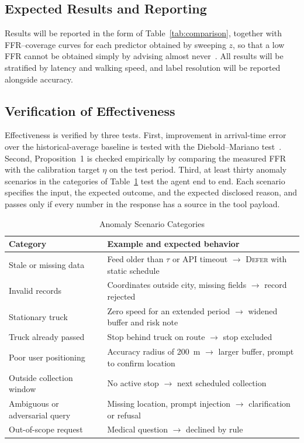 \subsection{Expected Results and Reporting}
Results will be reported in the form of Table~\ref{tab:comparison}, together with FFR--coverage curves for each predictor obtained by sweeping $z$, so that a low FFR cannot be obtained simply by advising almost never~\cite{geifman2017}. All results will be stratified by latency and walking speed, and label resolution will be reported alongside accuracy.



\subsection{Verification of Effectiveness}
Effectiveness is verified by three tests. First, improvement in arrival-time error over the historical-average baseline is tested with the Diebold--Mariano test~\cite{diebold1995}. Second, Proposition~1 is checked empirically by comparing the measured FFR with the calibration target $\eta$ on the test period. Third, at least thirty anomaly scenarios in the categories of Table~\ref{tab:anomaly} test the agent end to end. Each scenario specifies the input, the expected outcome, and the expected disclosed reason, and passes only if every number in the response has a source in the tool payload.

\begin{table}[t]
\caption{Anomaly Scenario Categories}
\label{tab:anomaly}
\centering
\footnotesize
\begin{tabular}{@{}p{}p{}@{}}
\toprule
Category & Example and expected behavior \\
\midrule
Stale or missing data & Feed older than $\tau$ or API timeout $\rightarrow$ \textsc{Defer} with static schedule \\
Invalid records & Coordinates outside city, missing fields $\rightarrow$ record rejected \\
Stationary truck & Zero speed for an extended period $\rightarrow$ widened buffer and risk note \\
Truck already passed & Stop behind truck on route $\rightarrow$ stop excluded \\
Poor user positioning & Accuracy radius of 200~m $\rightarrow$ larger buffer, prompt to confirm location \\
Outside collection window & No active stop $\rightarrow$ next scheduled collection \\
Ambiguous or adversarial query & Missing location, prompt injection $\rightarrow$ clarification or refusal \\
Out-of-scope request & Medical question $\rightarrow$ declined by rule \\
\bottomrule
\end{tabular}
\end{table}

